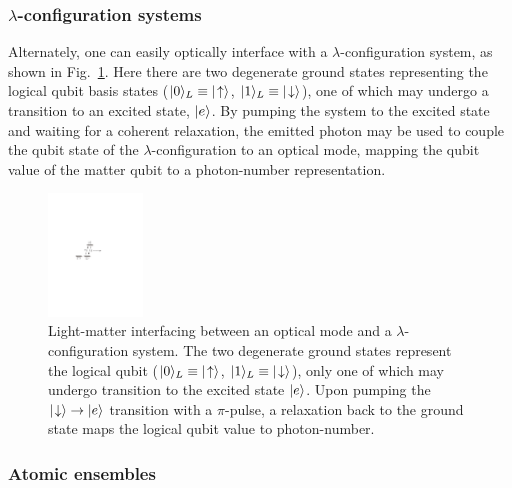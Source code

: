 %
%

\subsubsection{$\lambda$-configuration systems} 

Alternately, one can easily optically interface with a $\lambda$-configuration system, as shown in Fig.~\ref{fig:lambda_atom}. Here there are two degenerate ground states representing the logical qubit basis states (\mbox{$|0\rangle_L\equiv|\!\uparrow\rangle$}, \mbox{$|1\rangle_L\equiv|\!\downarrow\rangle$}), one of which may undergo a transition to an excited state, $|e\rangle$. By pumping the system to the excited state and waiting for a coherent relaxation, the emitted photon may be used to couple the qubit state of the $\lambda$-configuration to an optical mode, mapping the qubit value of the matter qubit to a photon-number representation.

\begin{figure}[!htb]
\includegraphics[width=0.225\textwidth]{lambda_atom}
\caption{Light-matter interfacing between an optical mode and a $\lambda$-configuration system. The two degenerate ground states represent the logical qubit (\mbox{$|0\rangle_L\equiv|\!\uparrow\rangle$}, \mbox{$|1\rangle_L\equiv|\!\downarrow\rangle$}), only one of which may undergo transition to the excited state $|e\rangle$. Upon pumping the \mbox{$|\!\downarrow\rangle\to|e\rangle$} transition with a $\pi$-pulse, a relaxation back to the ground state maps the logical qubit value to photon-number.} \label{fig:lambda_atom}
\end{figure}

%
%

\subsubsection{Atomic ensembles} \label{sec:atomic_ens} 

